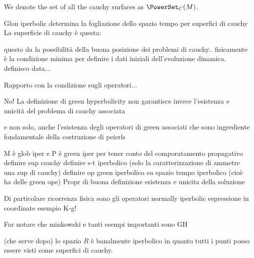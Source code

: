 \documentclass[Main]{subfiles}
\begin{document}
			\begin{notationfix}
				We denote the set of all the cauchy surfaces as $\PowerSet_{C}(M)$.
			\end{notationfix}
					

		Glon iperbolic determina la fogliazione dello spazio tempo per superfici di cauchy
		La superficie di cauchy è questa:
		\begin{definition}
		\end{definition}		
		questo da la possibilità della buona posizione dei problemi di cauchy.. fisicamente è la condizione minima per definire i dati iniziali dell'evoluzione dinamica.
		definisco data...
						
		\begin{Warning}
		Rapporto con la condizione sugli operatori...		
		
				
	No!		La definizione di green hyperbolicity non garantisce invece l'esistenza e unicità del problema di cauchy associata
		
		e non solo, anche l'esistenza degli operatori di green associati che sono ingrediente fondamentale della costruzione di peierls

		M è glob iper e P è green iper per tener conto del comporatamento propagativo
		definire sup cauchy
		definire s-t iperbolico (solo la caratterizzazione di ammetre una sup di cauchy)
		definire op green iperbolico su spazio tempo iperbolico (cioè ha delle green ope)
		Propr di buona definizione esistenza e unicita della soluzione
		
		Di particolare ricorrenza fisica sono gli operatori normally iperbolic
		espressione in coordinate
		esempio K-g!
		\end{Warning}						
		
		\begin{Warning}
			Far notare che minkowski e tanti esempi importanti sono GH
		\end{Warning}
		
		\begin{observation}
		(che serve dopo) lo spazio $R$ è banalmente iperbolico in quanto tutti i punti posso essere visti come superfici di cauchy.
		\end{observation}
			
							


\end{document}
